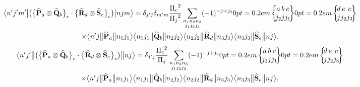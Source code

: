 \begin{gather}
\braOket{n^{\prime} j^{\prime} m^{\prime}}{\bigl(\bigl\{\widehat{\vect{P}}_{a} \otimes \widehat{\vect{Q}}_{b}\bigr\}_{c} \cdot\bigl\{\widehat{\vect{R}}_{d} \otimes \widehat{\vect{S}}_{e}\bigr\}_{c}\bigr)}{n j m}=\delta_{j^{\prime} j} \delta_{m^{\prime} m} \frac{\Fact{c}^{2}}{\Fact{j}^{2}} \sum_{\substack{n_{1} n_{2} n_{3} \\
j_{1} j_{2} j_{3}}}(-1)^{-j+j_{2}}
\sixj{a}{b}{c}{j_{2}}{j}{j_{1}}
\sixj{d}{e}{c}{j}{j_{2}}{j_{3}} \notag\\
\times
\braOketred{ n^{\prime} j}{\widehat{\vect{P}}_{a}}{ n_{1} j_{1}}
\braOketred{ n_{1} j_{1}}{\widehat{\vect{Q}}_{b}}{ n_{2} j_{2}}
\braOketred{ n_{2} j_{2}}{\widehat{\vect{R}}_{d}}{ n_{3} j_{3}}
\braOketred{ n_{3} j_{3}}{\widehat{\vect{S}}_{e}}{ n j} . \label{eq:13:1:19}
\end{gather}
\begin{multline*}
\braOketred{n^{\prime} j^{\prime}}{\bigl(\bigl\{\widehat{\vect{P}}_{a} \otimes \widehat{\vect{Q}}_{b}\bigr\}_{c} \cdot\bigl\{\widehat{\vect{R}}_{d} \otimes \widehat{\vect{S}}_{e}\bigr\}_{c}\bigr)}{n j}=\delta_{j^{\prime} j} \frac{\Fact{c}^{2}}{\Fact{j}} \sum_{\substack{n_{1} n_{2} n_{3} \\ j_{1} j_{2} j_{3}}}(-1)^{-j+j_{2}}
\sixj{a}{b}{c}{j_{2}}{j}{j_{1}}
\sixj{d}{e}{c}{j}{j_{2}}{j_{3}} \\
\times
\braOketred{ n^{\prime} j}{\widehat{\vect{P}}_{a}}{ n_{1} j_{1}}
\braOketred{ n_{1} j_{1}}{\widehat{\vect{Q}}_{b}}{ n_{2} j_{2}}
\braOketred{ n_{2} j_{2}}{\widehat{\vect{R}}_{d}}{ n_{3} j_{3}}
\braOketred{ n_{3} j_{3}}{\widehat{\vect{S}}_{e}}{ n j} .
\end{multline*}
